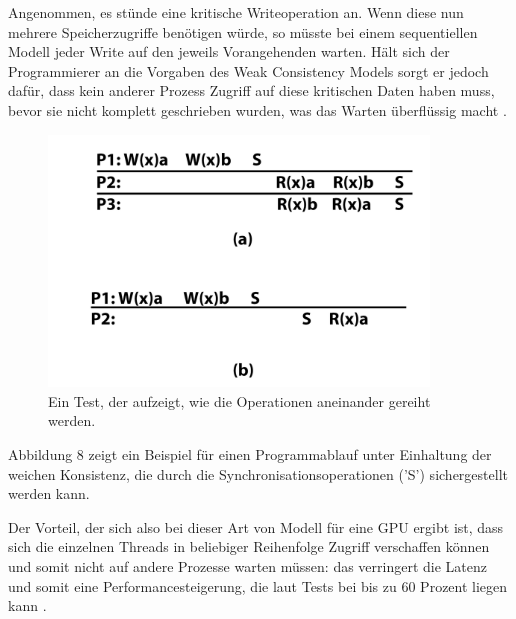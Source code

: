 \documentclass[final,bibliography=totocnumbered]{include/sikseminar}
\begin{document}
Angenommen, es stünde eine kritische Writeoperation an. Wenn diese nun mehrere Speicherzugriffe benötigen würde, so müsste bei einem sequentiellen Modell jeder Write auf den jeweils Vorangehenden warten. Hält sich der Programmierer an die Vorgaben des Weak Consistency Models sorgt er jedoch dafür, dass kein anderer Prozess Zugriff auf diese kritischen Daten haben muss, bevor sie nicht komplett geschrieben wurden, was das Warten überflüssig macht \cite{mcm}. 
\begin{figure}[htbp] %
  \centering
  \includegraphics[width=0.9\textwidth]{figures/weaklit}
  \caption{Ein Test, der aufzeigt, wie die Operationen aneinander gereiht werden. \cite{}}
  \label{Fig:weak}
\end{figure}

Abbildung 8 zeigt ein Beispiel für einen Programmablauf unter Einhaltung der weichen Konsistenz, die durch die Synchronisationsoperationen ('S') sichergestellt werden kann.

Der Vorteil, der sich also bei dieser Art von Modell für eine GPU ergibt ist, dass sich die einzelnen Threads in beliebiger Reihenfolge Zugriff verschaffen können und somit nicht auf andere Prozesse warten müssen: 
das verringert die Latenz  und somit eine Performancesteigerung, die laut Tests bei bis zu 60 Prozent liegen kann \cite{exploit}. 
\end{document}
